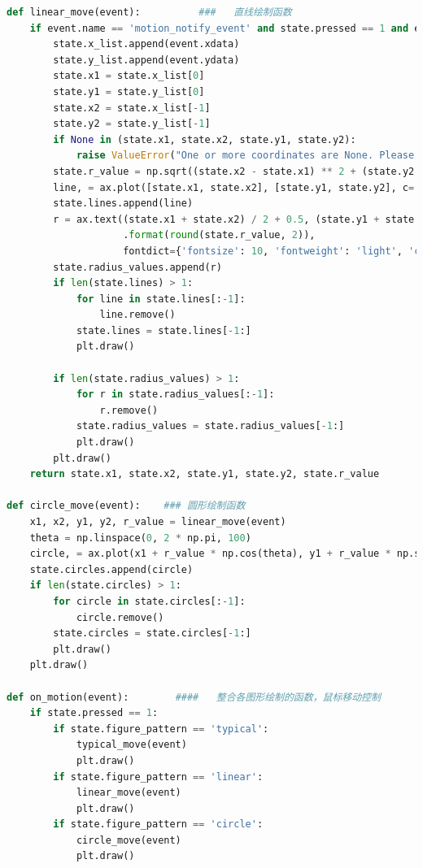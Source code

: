 \documentclass[12pt]{article}
\begin{document}
\begin{lstlisting}[language=Python]
def linear_move(event):          ###   直线绘制函数
    if event.name == 'motion_notify_event' and state.pressed == 1 and event.inaxes is not None:
        state.x_list.append(event.xdata)
        state.y_list.append(event.ydata)
        state.x1 = state.x_list[0]
        state.y1 = state.y_list[0]
        state.x2 = state.x_list[-1]
        state.y2 = state.y_list[-1]
        if None in (state.x1, state.x2, state.y1, state.y2):
            raise ValueError("One or more coordinates are None. Please check the input data.")
        state.r_value = np.sqrt((state.x2 - state.x1) ** 2 + (state.y2 - state.y1) ** 2)
        line, = ax.plot([state.x1, state.x2], [state.y1, state.y2], c='r')
        state.lines.append(line)
        r = ax.text((state.x1 + state.x2) / 2 + 0.5, (state.y1 + state.y2) / 2 + 0.5, 'r={}'
                    .format(round(state.r_value, 2)),
                    fontdict={'fontsize': 10, 'fontweight': 'light', 'color': 'blue'})
        state.radius_values.append(r)
        if len(state.lines) > 1:
            for line in state.lines[:-1]:
                line.remove()
            state.lines = state.lines[-1:]
            plt.draw()

        if len(state.radius_values) > 1:
            for r in state.radius_values[:-1]:
                r.remove()
            state.radius_values = state.radius_values[-1:]
            plt.draw()
        plt.draw()
    return state.x1, state.x2, state.y1, state.y2, state.r_value

def circle_move(event):    ### 圆形绘制函数
    x1, x2, y1, y2, r_value = linear_move(event)
    theta = np.linspace(0, 2 * np.pi, 100)
    circle, = ax.plot(x1 + r_value * np.cos(theta), y1 + r_value * np.sin(theta), c='r')
    state.circles.append(circle)
    if len(state.circles) > 1:
        for circle in state.circles[:-1]:
            circle.remove()
        state.circles = state.circles[-1:]
        plt.draw()
    plt.draw()

def on_motion(event):        ####   整合各图形绘制的函数，鼠标移动控制
    if state.pressed == 1:
        if state.figure_pattern == 'typical':
            typical_move(event)
            plt.draw()
        if state.figure_pattern == 'linear':
            linear_move(event)
            plt.draw()
        if state.figure_pattern == 'circle':
            circle_move(event)
            plt.draw()


\end{lstlisting}
\end{document}
